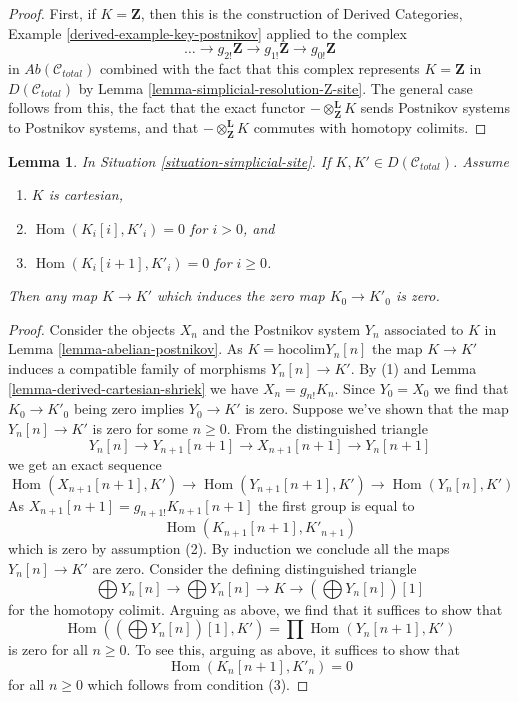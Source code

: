 \documentclass{stacks-project}
\theoremstyle{plain}
\newtheorem{lemma}[subsection]{Lemma}
\theoremstyle{definition}
\theoremstyle{remark}
\numberwithin{equation}{subsection}
\def\Hom{\mathop{\mathrm{Hom}}\nolimits}
\begin{document}
\begin{proof}
First, if $K = \mathbf{Z}$, then this is the construction of
Derived Categories, Example \ref{derived-example-key-postnikov}
applied to the complex
$$
\ldots \to
g_{2!}\mathbf{Z} \to
g_{1!}\mathbf{Z} \to
g_{0!}\mathbf{Z}
$$
in $\textit{Ab}(\mathcal{C}_{total})$ combined with the fact that
this complex represents $K = \mathbf{Z}$ in $D(\mathcal{C}_{total})$
by Lemma \ref{lemma-simplicial-resolution-Z-site}.
The general case follows from this, the fact that the exact functor
$- \otimes^\mathbf{L}_\mathbf{Z} K$ sends Postnikov systems to
Postnikov systems, and
that $- \otimes^\mathbf{L}_\mathbf{Z} K$ commutes with homotopy colimits.
\end{proof}

\begin{lemma}
\label{lemma-nullity-cartesian-objects-derived}
In Situation \ref{situation-simplicial-site}.
If $K, K' \in D(\mathcal{C}_{total})$.
Assume
\begin{enumerate}
\item $K$ is cartesian,
\item $\Hom(K_i[i], K'_i) = 0$ for $i > 0$, and
\item $\Hom(K_i[i + 1], K'_i) = 0$ for $i \geq 0$.
\end{enumerate}
Then any map $K \to K'$ which induces the zero map $K_0 \to K'_0$ is zero.
\end{lemma}

\begin{proof}
Consider the objects $X_n$ and the Postnikov system $Y_n$
associated to $K$ in Lemma \ref{lemma-abelian-postnikov}.
As $K = \text{hocolim} Y_n[n]$ the map $K \to K'$ induces
a compatible family of morphisms $Y_n[n] \to K'$.
By (1) and Lemma \ref{lemma-derived-cartesian-shriek} we have
$X_n = g_{n!}K_n$. Since $Y_0 = X_0$ we find that
$K_0 \to K'_0$ being zero implies $Y_0 \to K'$ is zero.
Suppose we've shown that the map $Y_n[n] \to K'$ is zero
for some $n \geq 0$. From the distinguished triangle
$$
Y_n[n] \to Y_{n + 1}[n + 1] \to X_{n + 1}[n + 1] \to Y_n[n + 1]
$$
we get an exact sequence
$$
\Hom(X_{n + 1}[n + 1], K') \to
\Hom(Y_{n + 1}[n + 1], K') \to
\Hom(Y_n[n], K')
$$
As $X_{n + 1}[n + 1] = g_{n + 1!}K_{n + 1}[n + 1]$ the first group is equal to
$$
\Hom(K_{n + 1}[n + 1], K'_{n + 1})
$$
which is zero by assumption (2). By induction we conclude all the maps
$Y_n[n] \to K'$ are zero. Consider the defining distinguished triangle
$$
\bigoplus Y_n[n] \to
\bigoplus Y_n[n] \to
K \to
(\bigoplus Y_n[n])[1]
$$
for the homotopy colimit. Arguing as above, we find that it suffices
to show that
$$
\Hom((\bigoplus Y_n[n])[1], K') = \prod \Hom(Y_n[n + 1], K')
$$
is zero for all $n \geq 0$. To see this, arguing as above,
it suffices to show that
$$
\Hom(K_n[n + 1], K'_n)  = 0
$$
for all $n \geq 0$ which follows from condition (3).
\end{proof}
\end{document}
